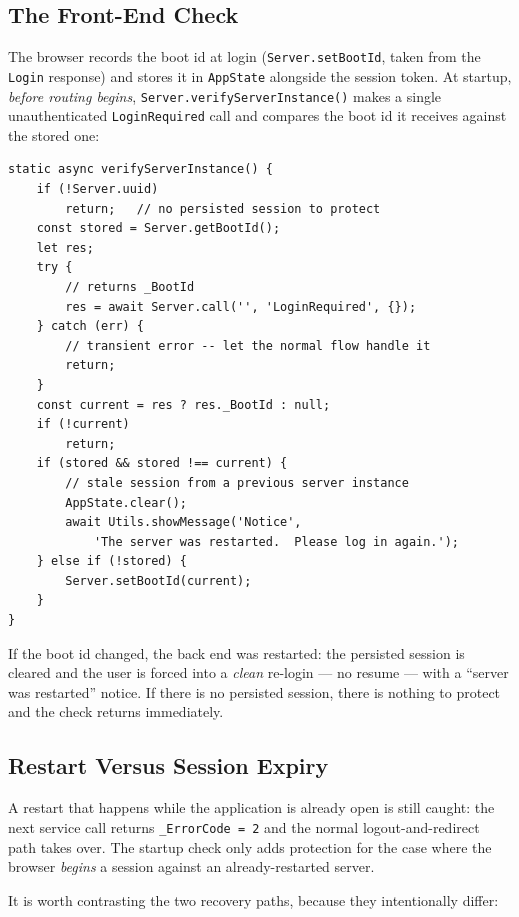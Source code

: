 \subsection{The Front-End Check}

The browser records the boot id at login (\texttt{Server.setBootId}, taken from the \texttt{Login} response) and stores it in \texttt{AppState} alongside the session token.  At startup, \emph{before routing begins}, \texttt{Server.verifyServerInstance()} makes a single unauthenticated \texttt{LoginRequired} call and compares the boot id it receives against the stored one:

\begin{lstlisting}[style=javascript]
static async verifyServerInstance() {
    if (!Server.uuid)
        return;   // no persisted session to protect
    const stored = Server.getBootId();
    let res;
    try {
        // returns _BootId
        res = await Server.call('', 'LoginRequired', {});
    } catch (err) {
        // transient error -- let the normal flow handle it
        return;
    }
    const current = res ? res._BootId : null;
    if (!current)
        return;
    if (stored && stored !== current) {
        // stale session from a previous server instance
        AppState.clear();
        await Utils.showMessage('Notice',
            'The server was restarted.  Please log in again.');
    } else if (!stored) {
        Server.setBootId(current);
    }
}
\end{lstlisting}

\noindent
If the boot id changed, the back end was restarted: the persisted session is cleared and the user is forced into a \emph{clean} re-login --- no resume --- with a ``server was restarted'' notice.  If there is no persisted session, there is nothing to protect and the check returns immediately.

\subsection{Restart Versus Session Expiry}

A restart that happens while the application is already open is still caught: the next service call returns \texttt{\_ErrorCode = 2} and the normal logout-and-redirect path takes over.  The startup check only adds protection for the case where the browser \emph{begins} a session against an already-restarted server.

It is worth contrasting the two recovery paths, because they intentionally differ:


